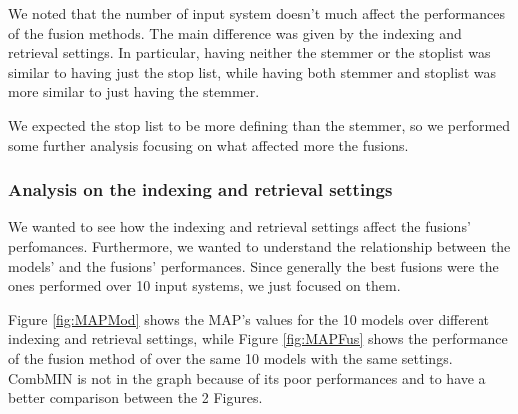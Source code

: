 	We noted that the number of input system doesn't much affect the performances of the fusion methods. The main difference was given by the indexing and retrieval settings. In particular, having neither the stemmer or the stoplist was similar to having just the stop list, while having both stemmer and stoplist was more similar to just having the stemmer.
	
	We expected the stop list to be more defining than the stemmer, so we performed some further analysis focusing on what affected more the fusions.
	
	\subsubsection{Analysis on the indexing and retrieval settings}
	We wanted to see how the indexing and retrieval settings affect the fusions' perfomances. Furthermore, we wanted to understand the relationship between the models' and the fusions' performances.
	Since generally the best fusions were the ones performed over 10 input systems, we just focused on them. 
	
	Figure \ref{fig:MAPMod} shows the MAP's values for the 10 models over different indexing and retrieval settings, while Figure \ref{fig:MAPFus} shows the performance of the fusion  method of over the same 10 models with the same settings. CombMIN is not in the graph because of its poor performances and to have a better comparison between the 2 Figures.
	
